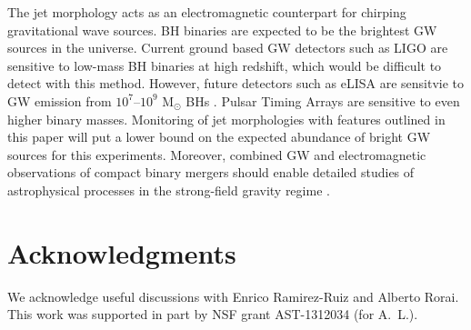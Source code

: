 \documentclass[a4paper,fleqn,usenatbib]{mnras}
\begin{document}
The jet morphology acts as an electromagnetic counterpart for chirping
gravitational wave sources.  BH binaries are expected to be the
brightest GW sources in the universe.  Current ground based GW
detectors such as LIGO are sensitive to low-mass BH binaries at high
redshift, which would be difficult to detect with this method.
However, future detectors such as eLISA are sensitvie to GW emission
from $10^7$--$10^9$ M$_\odot$ BHs \citep{2013CQGra..30x4009S}.  Pulsar
Timing Arrays are sensitive to even higher binary masses.  Monitoring
of jet morphologies with features outlined in this paper will put a
lower bound on the expected abundance of bright GW sources for this
experiments. Moreover, combined GW and electromagnetic observations of
compact binary mergers should enable detailed studies of astrophysical
processes in the strong-field gravity regime
\citep{2005ApJ...629...15H}.


\section*{Acknowledgments}

We acknowledge useful discussions with Enrico Ramirez-Ruiz and Alberto
Rorai.  This work was supported in part by NSF grant AST-1312034 (for
A.~L.).



\bsp	%
\label{lastpage}
\end{document}
